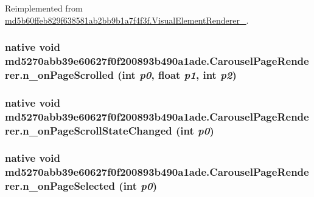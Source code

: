 Reimplemented from \hyperlink{classmd5b60ffeb829f638581ab2bb9b1a7f4f3f_1_1_visual_element_renderer__1_93658aeaafe1fbcb5301e4b9cbf9f833}{md5b60ffeb829f638581ab2bb9b1a7f4f3f.VisualElementRenderer\_}.\hypertarget{classmd5270abb39e60627f0f200893b490a1ade_1_1_carousel_page_renderer_54806a422e44f11b84b52905c7f88314}{
\subsubsection[{n\_\-onPageScrolled}]{\setlength{\rightskip}{0pt plus 5cm}native void md5270abb39e60627f0f200893b490a1ade.CarouselPageRenderer.n\_\-onPageScrolled (int {\em p0}, \/  float {\em p1}, \/  int {\em p2})}}
\label{classmd5270abb39e60627f0f200893b490a1ade_1_1_carousel_page_renderer_54806a422e44f11b84b52905c7f88314}


\hypertarget{classmd5270abb39e60627f0f200893b490a1ade_1_1_carousel_page_renderer_41963e1af7e5310a4730f4c2485aec69}{
\subsubsection[{n\_\-onPageScrollStateChanged}]{\setlength{\rightskip}{0pt plus 5cm}native void md5270abb39e60627f0f200893b490a1ade.CarouselPageRenderer.n\_\-onPageScrollStateChanged (int {\em p0})}}
\label{classmd5270abb39e60627f0f200893b490a1ade_1_1_carousel_page_renderer_41963e1af7e5310a4730f4c2485aec69}


\hypertarget{classmd5270abb39e60627f0f200893b490a1ade_1_1_carousel_page_renderer_b84a3441e29c02bf48219aeaeb010773}{
\subsubsection[{n\_\-onPageSelected}]{\setlength{\rightskip}{0pt plus 5cm}native void md5270abb39e60627f0f200893b490a1ade.CarouselPageRenderer.n\_\-onPageSelected (int {\em p0})}}
\label{classmd5270abb39e60627f0f200893b490a1ade_1_1_carousel_page_renderer_b84a3441e29c02bf48219aeaeb010773}


